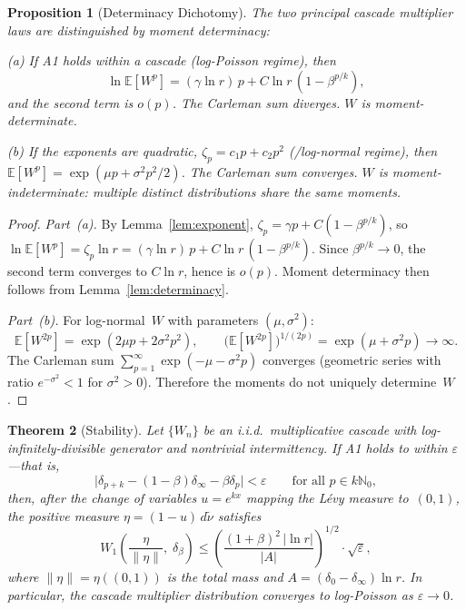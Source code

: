 \documentclass[12pt]{amsart}
\newtheorem{theorem}{Theorem}
\newtheorem{proposition}[theorem]{Proposition}
\theoremstyle{definition}
\theoremstyle{remark}
\begin{document}
\begin{proposition}[Determinacy Dichotomy]\label{prop:determinacy}
The two principal cascade multiplier laws are distinguished by moment
determinacy:

\textup{(a)} If A1 holds within a cascade (log-Poisson regime), then
\[
  \ln\mathbb{E}[W^p]
  = (\gamma\ln r)\,p + C\ln r\,(1 - \beta^{p/k}),
\]
and the second term is $o(p)$.
The Carleman sum diverges.  $W$ is moment-determinate.

\textup{(b)} If the exponents are quadratic, $\zeta_p = c_1 p +
c_2 p^2$ (\textup{\cite{K62}}/log-normal regime), then
$\mathbb{E}[W^p] = \exp(\mu p + \sigma^2 p^2/2)$.  The Carleman sum
converges.  $W$ is moment-indeterminate: multiple distinct
distributions share the same moments.
\end{proposition}

\begin{proof}
\textit{Part~\textup{(a)}.}  By Lemma~\ref{lem:exponent}, $\zeta_p =
\gamma p + C(1-\beta^{p/k})$, so $\ln\mathbb{E}[W^p] = \zeta_p \ln r
= (\gamma\ln r)\,p + C\ln r\,(1-\beta^{p/k})$.  Since
$\beta^{p/k} \to 0$, the second term converges to $C\ln r$,
hence is $o(p)$.  Moment determinacy then follows from
Lemma~\ref{lem:determinacy}.

\textit{Part~\textup{(b)}.}
For log-normal~$W$ with parameters $(\mu, \sigma^2)$:
\[
  \mathbb{E}[W^{2p}] = \exp(2\mu p + 2\sigma^2 p^2),
  \qquad
  \bigl(\mathbb{E}[W^{2p}]\bigr)^{1/(2p)} = \exp(\mu + \sigma^2 p)
  \to \infty.
\]
The Carleman sum $\sum_{p=1}^\infty \exp(-\mu - \sigma^2 p)$ converges
(geometric series with ratio $e^{-\sigma^2} < 1$ for $\sigma^2 > 0$).
Therefore the moments do not uniquely determine~$W$.
\end{proof}


\begin{theorem}[Stability]\label{thm:stability}
Let $\{W_n\}$ be an i.i.d.\ multiplicative cascade with
log-infinitely-divisible generator and nontrivial intermittency.  If
A1 holds to within $\varepsilon$---that is,
\[
  \bigl|\delta_{p+k} - (1-\beta)\delta_\infty - \beta\delta_p\bigr|
  < \varepsilon
  \qquad\text{for all } p \in k\mathbb{N}_0,
\]
then, after the change of variables $u = e^{kx}$ mapping the L\'evy
measure to~$(0,1)$, the positive measure $\eta = (1-u)\,d\tilde\nu$
satisfies
\[
  W_1\!\left(\frac{\eta}{\|\eta\|},\;\delta_\beta\right)
  \leq
  \left(\frac{(1+\beta)^2\,|\ln r|}{|A|}\right)^{\!1/2}
  \!\cdot\sqrt{\varepsilon},
\]
where $\|\eta\| = \eta((0,1))$ is the total mass and $A = (\delta_0 -
\delta_\infty)\ln r$.  In particular, the cascade multiplier
distribution converges to log-Poisson as $\varepsilon \to 0$.
\end{theorem}
\end{document}

